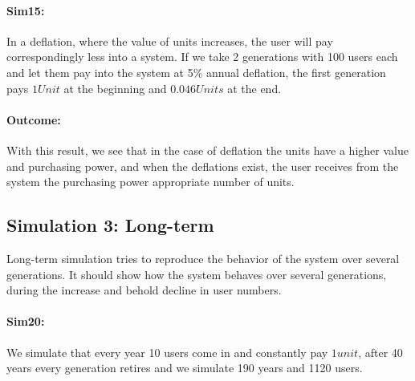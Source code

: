 \paragraph{Sim15:} In a deflation, where the value of units increases, the user will pay correspondingly less into a system. If we take 2 generations with 100 users each and let them pay into the system at 5\% annual deflation, the first generation pays $1 Unit$ at the beginning and $0.046 Units$ at the end. 

\paragraph{Outcome:}

\begin{table}[hbt!]
\centering
{}
\end{table}

With this result, we see that in the case of deflation the units have a higher value and purchasing power, and when the deflations exist, the user receives from the system the purchasing power appropriate number of units.


\subsection{Simulation 3: Long-term}

Long-term simulation tries to reproduce the behavior of the system over several generations. It should show how the system behaves over several generations, during the increase and behold decline in user numbers.

\paragraph{Sim20:} We simulate that every year 10 users come in and constantly pay $1 unit$, after 40 years every generation retires and we simulate 190 years and 1120 users.

